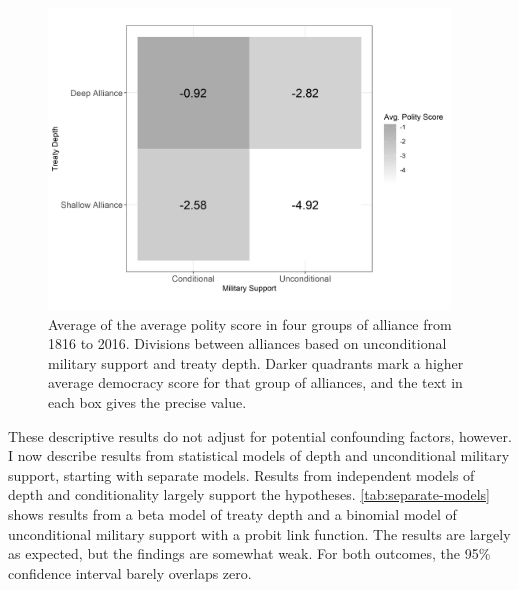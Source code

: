 \documentclass[12pt]{article}
\begin{document}
\begin{figure}[hbtp]
\centering
\includegraphics[width=0.95\textwidth]{../figures/democ-combo.png}
\caption{Average of the average polity score in four groups of alliance from 1816 to 2016. Divisions between alliances based on unconditional military support and treaty depth. Darker quadrants mark a higher average democracy score for that group of alliances, and the text in each box gives the precise value. }
\label{fig:democ-combo}
\end{figure}


These descriptive results do not adjust for potential confounding factors, however.
I now describe results from statistical models of depth and unconditional military support, starting with separate models. 
Results from independent models of depth and conditionality largely support the hypotheses. 
\autoref{tab:separate-models} shows results from a beta model of treaty depth and a binomial model of unconditional military support with a probit link function. 
The results are largely as expected, but the findings are somewhat weak.
For both outcomes, the 95\% confidence interval barely overlaps zero.  
\end{document}
